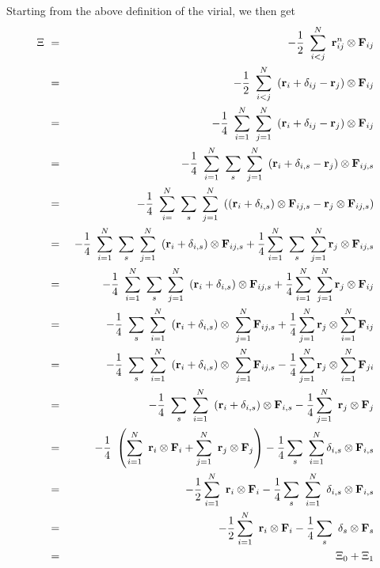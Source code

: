 Starting from the above definition of the virial, we then get
\newcommand{\di}{\delta_{i}}
\newcommand{\qrt}{\frac{1}{4}}
\begin{eqnarray}
\Xi
&~=~&-\half~\sum_{i < j}^{N}~{\mathbf r}^n_{ij} \otimes {\mathbf F}_{ij} \nonumber \\
&~=~&-\half~\sum_{i < j}^{N}~\left( {\mathbf r}_i + \delta_{ij} - {\mathbf r}_j \right) \otimes {\mathbf F}_{ij} \nonumber \\
&~=~&-\qrt~\sum_{i=1}^{N}~\sum_{j=1}^{N}~\left( {\mathbf r}_i + \delta_{ij} - {\mathbf r}_j \right) \otimes {\mathbf F}_{ij} \nonumber \\
&~=~&-\qrt~\sum_{i=1}^{N}~\sum_{s}~\sum_{j=1}^{N}~\left( {\mathbf r}_i + \delta_{i,s} - {\mathbf r}_j \right) \otimes {\mathbf F}_{ij,s} \nonumber \\
&~=~&-\qrt~\sum_{i=}^{N}~\sum_{s}~\sum_{j=1}^{N}~\left( \left( {\mathbf r}_i + \delta_{i,s} \right) \otimes {\mathbf F}_{ij,s} -{\mathbf r}_j \otimes {\mathbf F}_{ij,s} \right) \nonumber \\
&~=~&-\qrt~\sum_{i=1}^{N}~\sum_{s}~\sum_{j=1}^N ~\left( {\mathbf r}_i + \delta_{i,s} \right) \otimes {\mathbf F}_{ij,s} + \qrt \sum_{i=1}^{N}~\sum_{s}~\sum_{j=1}^{N} {\mathbf r}_j \otimes {\mathbf F}_{ij,s} \nonumber \\
&~=~&-\qrt~\sum_{i=1}^{N}~\sum_{s}~\sum_{j=1}^N ~\left( {\mathbf r}_i + \delta_{i,s} \right) \otimes {\mathbf F}_{ij,s} + \qrt \sum_{i=1}^{N}~\sum_{j=1}^{N} {\mathbf r}_j \otimes {\mathbf F}_{ij} \nonumber \\
&~=~&-\qrt~\sum_{s}~\sum_{i=1}^{N}~\left( {\mathbf r}_i + \delta_{i,s} \right) \otimes ~\sum_{j=1}^N {\mathbf F}_{ij,s} + \qrt \sum_{j=1}^N {\mathbf r}_j \otimes \sum_{i=1}^{N} {\mathbf F}_{ij} \nonumber \\
&~=~&-\qrt~\sum_{s}~\sum_{i=1}^{N}~\left( {\mathbf r}_i + \delta_{i,s} \right) \otimes ~\sum_{j=1}^N {\mathbf F}_{ij,s} - \qrt \sum_{j=1}^N {\mathbf r}_j \otimes \sum_{i=1}^{N} {\mathbf F}_{ji} \nonumber \\
&~=~&-\qrt~\sum_{s}~\sum_{i=1}^{N}~\left( {\mathbf r}_i + \delta_{i,s} \right) \otimes {\mathbf F}_{i,s} - \qrt \sum_{j=1}^N~{\mathbf r}_j \otimes {\mathbf F}_{j}  \nonumber \\
&~=~&-\qrt~\left(\sum_{i=1}^{N}~{\mathbf r}_i  \otimes {\mathbf F}_{i} + \sum_{j=1}^N~{\mathbf r}_j \otimes {\mathbf F}_{j} \right) - \qrt \sum_{s}~\sum_{i=1}^{N} \delta_{i,s} \otimes {\mathbf F}_{i,s}  \nonumber \\
&~=~&-\half \sum_{i=1}^{N}~{\mathbf r}_i \otimes {\mathbf F}_{i} -\qrt \sum_{s}~\sum_{i=1}^{N}~\delta_{i,s} \otimes {\mathbf F}_{i,s} \nonumber \\
&~=~&-\half \sum_{i=1}^{N}~{\mathbf r}_i \otimes {\mathbf F}_{i} -\qrt \sum_{s}~\delta_{s} \otimes {\mathbf F}_{s} \nonumber \\
&~=~&\Xi_0 + \Xi_1
\end{eqnarray}
